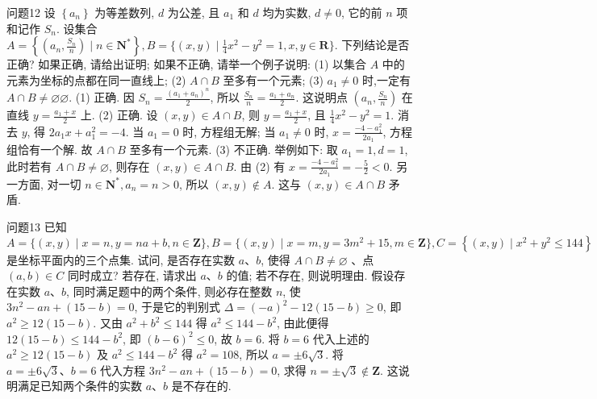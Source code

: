 问题12 设 $\left\{a_n\right\}$ 为等差数列, $d$ 为公差, 且 $a_1$ 和 $d$ 均为实数, $d \neq 0$, 它的前 $n$ 项和记作 $S_n$. 设集合 $A=\left\{\left(a_n, \frac{S_n}{n}\right) \mid n \in \mathbf{N}^*\right\}, B=\{(x, y) \mid \frac{1}{4} x^2-y^2= 1, x, y \in \mathbf{R}\}$. 下列结论是否正确? 如果正确, 请给出证明; 如果不正确, 请举一个例子说明:
(1) 以集合 $A$ 中的元素为坐标的点都在同一直线上;
(2) $A \cap B$ 至多有一个元素;
(3) $a_1 \neq 0$ 时,一定有 $A \cap B \neq \varnothing \varnothing$.
(1) 正确.
因 $S_n=\frac{\left(a_1+a_n\right)^n}{2}$, 所以 $\frac{S_n}{n}=\frac{a_1+a_n}{2}$. 这说明点 $\left(a_n, \frac{S_n}{n}\right)$ 在直线 $y=\frac{a_1+x}{2}$ 上.
(2) 正确.
设 $(x, y) \in A \cap B$, 则 $y=\frac{a_1+x}{2}$, 且 $\frac{1}{4} x^2-y^2=1$. 消去 $y$, 得 $2 a_1 x+a_1^2=-4$. 当 $a_1=0$ 时, 方程组无解; 当 $a_1 \neq 0$ 时, $x=\frac{-4-a_1^2}{2 a_1}$, 方程组恰有一个解.
故 $A \cap B$ 至多有一个元素.
(3) 不正确.
举例如下: 取 $a_1=1, d=1$, 此时若有 $A \cap B \neq \varnothing$, 则存在 $(x, y) \in A \cap B$. 由 (2) 有 $x=\frac{-4-a_1^2}{2 a_1}=-\frac{5}{2}<0$. 另一方面, 对一切 $n \in \mathbf{N}^*, a_n=n>0$, 所以 $(x, y) \notin A$. 这与 $(x, y) \in A \cap B$ 矛盾.



问题13 已知 $A=\{(x, y) \mid x=n, y=n a+b, n \in \mathbf{Z}\}, B=\{(x, y) \mid x=m, y=3 m^2+15, m \in \mathbf{Z} \}, C=\left\{(x, y) \mid x^2+y^2 \leqslant 144\right\}$ 是坐标平面内的三个点集.
试问, 是否存在实数 $a 、 b$, 使得 $A \cap B \neq \varnothing$ 、点 $(a, b) \in C$ 同时成立? 若存在, 请求出 $a 、 b$ 的值; 若不存在, 则说明理由.
假设存在实数 $a 、 b$, 同时满足题中的两个条件, 则必存在整数 $n$, 使 $3 n^2-a n+(15-b)=0$, 于是它的判别式 $\Delta=(-a)^2-12(15-b) \geqslant 0$, 即 $a^2 \geqslant 12(15-b)$. 又由 $a^2+b^2 \leqslant 144$ 得 $a^2 \leqslant 144-b^2$, 由此便得 $12(15- b) \leqslant 144-b^2$, 即 $(b-6)^2 \leqslant 0$, 故 $b=6$. 将 $b=6$ 代入上述的 $a^2 \geqslant 12(15-b)$ 及 $a^2 \leqslant 144-b^2$ 得 $a^2=108$, 所以 $a= \pm 6 \sqrt{3}$. 将 $a= \pm 6 \sqrt{3} 、 b=6$ 代入方程 $3 n^2-a n+(15-b)=0$, 求得 $n= \pm \sqrt{3} \notin \mathbf{Z}$. 这说明满足已知两个条件的实数 $a 、 b$ 是不存在的.



